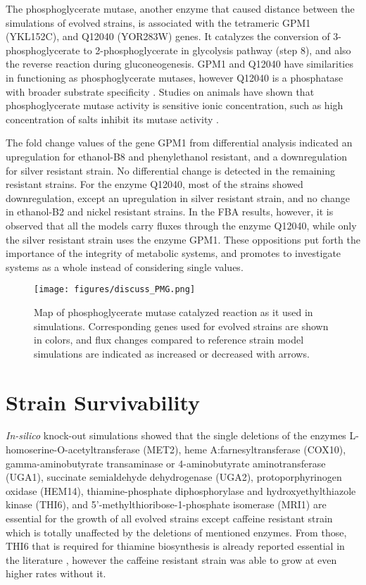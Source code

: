 \vspace{-0.5cm}

The phosphoglycerate mutase, another enzyme that caused distance between the simulations of evolved strains, is associated with the tetrameric GPM1 (YKL152C), and Q12040 (YOR283W) genes. It catalyzes the conversion of 3-phosphoglycerate to 2-phosphoglycerate in glycolysis pathway (step 8), and also the reverse reaction during gluconeogenesis. GPM1 and Q12040 have similarities in functioning as phosphoglycerate mutases, however Q12040 is a phosphatase with broader substrate specificity \cite{ho2009identification}. Studies on animals have shown that phosphoglycerate mutase activity is sensitive ionic concentration, such as high concentration of salts inhibit its mutase activity \cite{grisolia1967mercury}.

The fold change values of the gene GPM1 from differential analysis indicated an upregulation for ethanol-B8 and phenylethanol resistant, and a downregulation for silver resistant strain. No differential change is detected in the remaining resistant strains. For the enzyme Q12040, most of the strains showed downregulation, except an upregulation in silver resistant strain, and no change in ethanol-B2 and nickel resistant strains. In the FBA results, however, it is observed that all the models carry fluxes through the enzyme Q12040, while only the silver resistant strain uses the enzyme GPM1. These oppositions put forth the importance of the integrity of metabolic systems, and promotes to investigate systems as a whole instead of considering single values.
\begin{figure}[H]
\texttt{[image: figures/discuss\_PMG.png]}
\caption[Map of phosphoglycerate mutase catalyzed reaction as it used in simulations]{Map of phosphoglycerate mutase catalyzed reaction as it used in simulations. Corresponding genes used for evolved strains are shown in colors, and flux changes compared to reference strain model simulations are indicated as increased or decreased with arrows.}
\label{fig:discuss_PMG}
\end{figure}
\vspace{-0.5cm}

\section{Strain Survivability}
\emph{In-silico} knock-out simulations showed that the single deletions of the enzymes L-homoserine-O-acetyltransferase (MET2), heme A:farnesyltransferase (COX10), gamma-aminobutyrate transaminase or 4-aminobutyrate aminotransferase (UGA1), succinate semialdehyde dehydrogenase (UGA2), protoporphyrinogen oxidase (HEM14), thiamine-phosphate diphosphorylase and hydroxyethylthiazole kinase (THI6), and 5'-methylthioribose-1-phosphate isomerase (MRI1) are essential for the growth of all evolved strains except caffeine resistant strain which is totally unaffected by the deletions of mentioned enzymes. From those, THI6 that is required for thiamine biosynthesis is already reported essential in the literature \cite{nosaka1994isolation}, however the caffeine resistant strain was able to grow at even higher rates without it.

